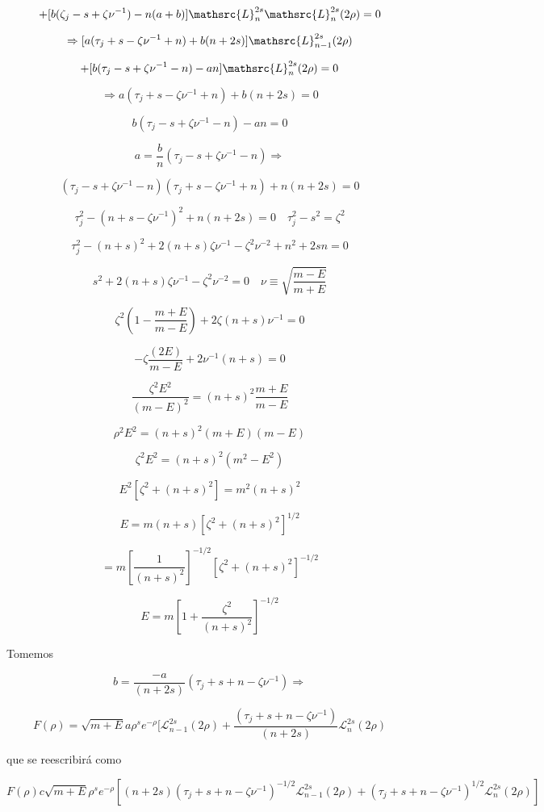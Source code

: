 \documentclass{report}
\begin{document}
\[+[b(\zeta _j - s + \zeta \nu ^{-1})-n(a+b)]\mathsrc{L}_{n}^{2s}\mathsrc{L}_{n}^{2s}(2\rho )=0 \]

\[\Rightarrow [a(\tau _j + s - \zeta \nu ^{-1} + n) + b (n+2s)]\mathsrc{L}_{n-1}^{2s}(2 \rho )\]

\[+[b(\tau _j -s + \zeta \nu ^{-1} - n) -an] \mathsrc{L}_{n}^{2s}(2 \rho) = 0\]

\[\Rightarrow a (\tau _j + s - \zeta \nu ^{-1} + n) + b (n+2s) = 0 \]

\[b(\tau _j - s + \zeta \nu ^{-1} -n) -an = 0\]

\[a = \frac{b}{n} (\tau _j - s + \zeta \nu ^{-1} -n) \Rightarrow \]

\[(\tau _j - s + \zeta \nu ^{-1} - n) (\tau _j + s - \zeta \nu ^{-1}+n)+n(n+2s) = 0\]

\[\tau_{j}^{2}-(n+s-\zeta \nu ^{-1})^2 + n (n+2s) = 0 \quad \tau _{j}^{2}-s^2 = \zeta ^2 \]

\[\tau _{j}^{2}-(n+s)^2 + 2 (n+s) \zeta \nu ^{-1} - \zeta ^2 \nu ^{-2} + n^2 + 2sn = 0\]

\[s^2 + 2(n+s)\zeta \nu ^{-1} - \zeta ^{2} \nu ^{-2} = 0 \quad \nu \equiv \sqrt{\frac{m-E}{m+E}}\]

\[\zeta ^2 (1- \frac{m+E}{m-E}) + 2 \zeta (n+s)\nu^{-1} = 0\]

\[- \zeta \frac{(2E)}{m-E} + 2 \nu ^{-1}(n+s)= 0\]

\[\frac{\zeta ^2 E^2}{(m-E)^2 } = (n+s)^2 \frac{m+E}{m-E}\]

\[\rho ^2 E^2 = (n+s)^2 (m+E)(m-E)\]

\[\zeta ^2 E^2 = (n+s)^2 (m^2 -E^2)\]

\[E^2 [\zeta ^2 + (n+s)^2]=m^2 (n+s)^2\]

\[E = m (n+s) [\zeta ^2 + (n+s)^2 ]^{1/2}\]

\[=m[\frac{1}{(n+s)^2}]^{-1/2} [\zeta ^2 + (n+s)^2 ]^{-1/2} \]

\begin{equation}
E = m[1+\frac{\zeta ^2 }{(n+s)^2}]^{-1/2}
\end{equation}

Tomemos

\[b = \frac{-a}{(n+2s)}(\tau _{j}+s+n-\zeta \nu ^{-1}) \Rightarrow\]

\[F(\rho ) = \sqrt{m+E} a \rho^s e^{-\rho } [\mathscr{L}_{n-1}^{2s}(2\rho )+ \frac{(\tau_j + s + n - \zeta \nu^{-1})}{(n+2s)} \mathscr{L}_{n}^{2s}(2 \rho) \]

que se reescribirá como

\[F(\rho ) c \sqrt{m+E} \rho ^s e^{- \rho } [(n+2s)(\tau_j + s + n- \zeta \nu^{-1})^{-1/2} \mathscr{L}_{n-1}^{2s} (2\rho ) + (\tau _j + s + n-\zeta \nu^{-1})^{1/2} \mathscr{L}_{n}^{2s}(2\rho)]\]
\end{document}

